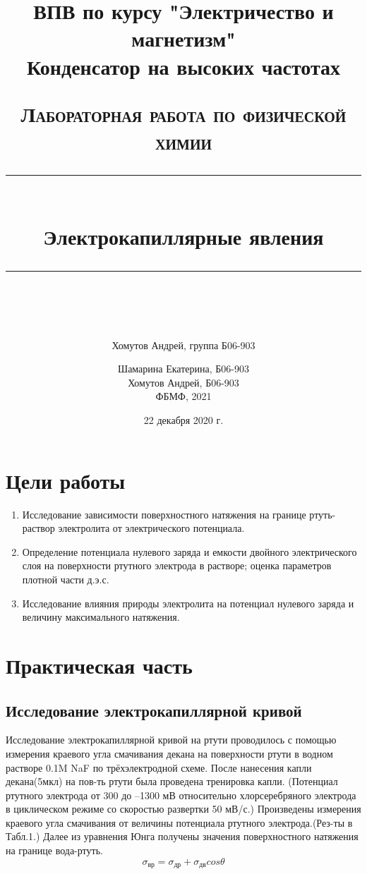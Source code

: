 \documentclass[a4paper, 12pt]{article}
\author{Хомутов Андрей, группа Б06-903}
\title{ВПВ по курсу "Электричество и магнетизм" \\ Конденсатор на высоких частотах}
\date{22 декабря 2020 г.}
\newcommand{\HRule}[1]{\rule{\linewidth}{#1}}
\begin{document}
\title{ \normalsize \textsc{Лабораторная работа по физической химии}
		\\ [4.0cm]
		\HRule{0.5pt} \\ [0.3cm]
		\LARGE \textbf{{Электрокапиллярные явления}}
		\HRule{0.5pt} \\ [0.1cm]
		\normalsize  \vspace*{18\baselineskip}}

\date{}

\author{Шамарина Екатерина, Б06-903 \\
		Хомутов Андрей, Б06-903 \\
ФБМФ, 2021\\ }

\maketitle
\thispagestyle{empty}
\newpage
\section*{Цели работы} 
\begin{enumerate}
    \item Исследование зависимости поверхностного натяжения на границе ртуть-раствор электролита от электрического потенциала.
    \item Определение потенциала нулевого заряда и емкости двойного электрического слоя на поверхности ртутного электрода в растворе; оценка параметров плотной части д.э.с.
    \item Исследование влияния природы электролита на потенциал нулевого заряда и величину максимального натяжения.
\end{enumerate}
\section{Практическая часть}
\subsection{Исследование электрокапиллярной кривой}
Исследование электрокапиллярной кривой на ртути проводилось с помощью измерения краевого угла смачивания декана на поверхности ртути в водном растворе 0.1M NaF по трёхэлектродной схеме. \newline
После нанесения капли декана(5мкл) на пов-ть ртути была проведена тренировка капли. (Потенциал ртутного электрода от 300 до –1300 мВ относительно хлорсеребряного электрода в циклическом режиме со скоростью развертки 50 мВ/с.) \newline
Произведены измерения краевого угла смачивания от величины потенциала ртутного электрода.(Рез-ты в Табл.1.) Далее из уравнения Юнга получены значения поверхностного натяжения на границе вода-ртуть. 
$$\sigma_{\text{вр}} = \sigma_{\text{др}} + \sigma_{\text{дв}} cos\theta$$
\end{document}
